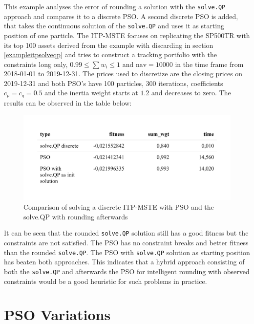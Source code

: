 \documentclass[
  oneside, a4paper, 12pt, openany]{book}
\theoremstyle{definition}
\theoremstyle{definition}
\theoremstyle{definition}
\theoremstyle{definition}
\theoremstyle{remark}
\begin{document}
This example analyses the error of rounding a solution with the \texttt{solve.QP} approach and compares it to a discrete PSO. A second discrete PSO is added, that takes the continuous solution of the \texttt{solve.QP} and uses it as starting position of one particle. The ITP-MSTE focuses on replicating the SP500TR with its top 100 assets derived from the example with discarding in section \ref{exampleitpsolveqp} and tries to construct a tracking portfolio with the constraints long only, \(0.99 \leq \textstyle\sum w_i \leq 1\) and \(\text{nav} = 10000\) in the time frame from 2018-01-01 to 2019-12-31. The prices used to discretize are the closing prices on 2019-12-31 and both PSO's have 100 particles, 300 iterations, coefficients \(c_p=c_g=0.5\) and the inertia weight starts at \(1.2\) and decreases to zero. The results can be observed in the table below:

\begin{figure}[H]
\includegraphics{Master_Thesis_files/figure-latex/pso9-1} \caption{Comparison of solving a discrete ITP-MSTE with PSO and the solve.QP with rounding afterwards}\label{fig:pso9}
\end{figure}

It can be seen that the rounded \texttt{solve.QP} solution still has a good fitness but the constraints are not satisfied. The PSO has no constraint breaks and better fitness than the rounded \texttt{solve.QP}. The PSO with \texttt{solve.QP} solution as starting position has beaten both approaches. This indicates that a hybrid approach consisting of both the \texttt{solve.QP} and afterwards the PSO for intelligent rounding with observed constraints would be a good heuristic for such problems in practice.

\hypertarget{psovariants}{%
\chapter{PSO Variations}\label{psovariants}}
\end{document}
